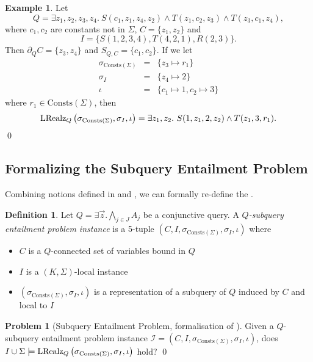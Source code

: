 \documentclass[12pt]{report}
\theoremstyle{plain}
\theoremstyle{definition}
\newtheorem{problem}[theorem]{Problem}
\newtheorem{definition}[theorem]{Definition}
\newtheorem{example}[theorem]{Example}
\def\Consts{{\mathrm{Consts}}}
\newcommand{\LRealz}[2]{\ensuremath{\normalfont{\textrm{LRealz}}_{ #1 } \left( #2 \right)}}
\begin{document}
\begin{example}
\label{local-realisation-of-subquery-representation}
  Let
  $$
    Q = \exists z_1,z_2,z_3,z_4.\ S(c_1, z_1, z_4, z_2) \wedge T(z_1, c_2, z_3) \wedge T(z_3, c_1, z_4),
  $$
  where $c_1, c_2$ are constants not in $\Sigma$, $C = \{z_1, z_2\}$ and $$I = \{ S(1, 2, 3, 4), T(4, 2, 1), R(2, 3) \}.$$
  Then $\partial_Q C = \{ z_3, z_4 \}$ and $S_{Q,C} = \{c_1, c_2\}$. If we let
  \[\begin{array}{rcl}
    \sigma_{\Consts(\Sigma)} &=& \{ z_3 \mapsto r_1 \} \\
    \sigma_I &=& \{ z_4 \mapsto 2 \} \\
    \iota &=& \{ c_1 \mapsto 1, c_2 \mapsto 3 \}
  \end{array}\]
  where $r_1 \in \Consts(\Sigma)$, then $$
  \LRealz{Q}{\sigma_{\Consts(\Sigma)}, \sigma_I, \iota} = \exists z_1, z_2.\ S(1, z_1, 2, z_2) \wedge T(z_1, 3, r_1).
  $$
  \qed
\end{example}

\subsection{Formalizing the Subquery Entailment Problem}

Combining notions defined in  and , we can formally re-define the .

\begin{definition}
  Let $Q = \exists \vec{z}. \bigwedge_{j \in J} A_j$ be a conjunctive query. A \emph{$Q$-subquery entailment problem instance} is a 5-tuple $(C, I, \sigma_{\Consts(\Sigma)}, \sigma_I, \iota)$ where
  \begin{itemize}
    \item $C$ is a $Q$-connected set of variables bound in $Q$
    \item $I$ is a $(K, \Sigma)$-local instance
    \item $(\sigma_{\Consts(\Sigma)}, \sigma_I, \iota)$ is a representation of a subquery of $Q$ induced by $C$ and local to $I$
  \end{itemize}
\end{definition}

\begin{problem}[Subquery Entailment Problem, formalisation of ]
\label{subquery-entailment-problem}
  Given a $Q$-subquery entailment problem instance $\mathcal{I} = (C, I, \sigma_{\Consts(\Sigma)}, \sigma_I, \iota)$, does $I \cup \Sigma \models \LRealz{Q}{\sigma_{\Consts(\Sigma)}, \sigma_I, \iota}$ hold?
  \qed
\end{problem}
\end{document}
